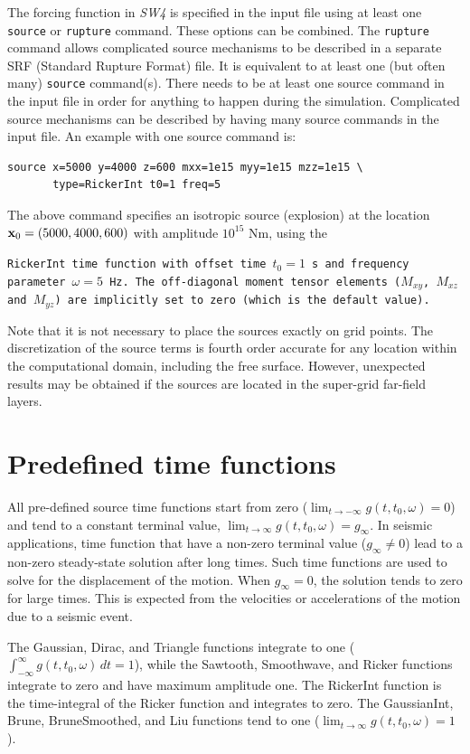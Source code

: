 \documentclass[11pt]{report}
\begin{document}
The forcing function in \emph{SW4} is specified in the input file using at least one {\tt source} or
	{\tt rupture} command. These options can be combined. The {\tt rupture} command allows complicated
source mechanisms to be described in a separate SRF (Standard Rupture Format) file. It is equivalent
to at least one (but often many) {\tt source} command(s). There needs to be at least one source
command in the input file in order for anything to happen during the simulation. Complicated source
mechanisms can be described by having many source commands in the input file. An example with one
source command is:
\begin{verbatim}
source x=5000 y=4000 z=600 mxx=1e15 myy=1e15 mzz=1e15 \
       type=RickerInt t0=1 freq=5
\end{verbatim}
The above command specifies an isotropic source (explosion) at the location ${\bf
			x}_0=(5000,4000,600)$ with amplitude $10^{15}$ Nm, using the {\tt RickerInt time function with
offset time $t_0=1$ s and frequency parameter $\omega=5$ Hz. The off-diagonal moment tensor elements
($M_{xy}$, $M_{xz}$ and $M_{yz}$) are implicitly set to zero (which is the default value).

Note that it is not necessary to place the sources exactly on grid points. The discretization of the
source terms is fourth order accurate for any location within the computational domain, including
the free surface. However, unexpected results may be obtained if the sources are located in the
super-grid far-field layers.


\section{Predefined time functions}\label{sec:predefined}

All pre-defined source time functions start from zero ($\lim_{t\to -\infty} g(t,t_0,\omega) = 0$)
and tend to a constant terminal value, $\lim_{t\to \infty} g(t,t_0,\omega) = g_\infty$. In seismic
applications, time function that have a non-zero terminal value ($g_\infty\ne 0$) lead to a non-zero
steady-state solution after long times. Such time functions are used to solve for the displacement
of the motion. When $g_\infty = 0$, the solution tends to zero for large times. This is
expected from the velocities or accelerations of the motion due to a seismic event.

The Gaussian, Dirac, and Triangle functions integrate to one ($\int_{-\infty}^{\infty}
	g(t,t_0,\omega) \, dt = 1$), while the Sawtooth, Smoothwave, and Ricker functions integrate to zero
and have maximum amplitude one. The RickerInt function is the time-integral of the Ricker function
and integrates to zero. The GaussianInt, Brune, BruneSmoothed, and Liu functions tend to one
($\lim_{t\to\infty} g(t,t_0,\omega) = 1$).

}
\end{document}
